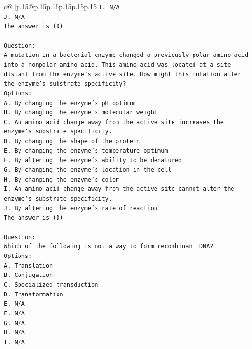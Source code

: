 \documentclass{article}
\begin{document}
{\begin{supertabular}{c@{$\;$}|p{.15\linewidth}@{}p{.15\linewidth}p{.15\linewidth}p{.15\linewidth}p{.15\linewidth}p{.15\linewidth}}
{{{\texttt{I. N/A} \\
\texttt{J. N/A} \\
\texttt{The answer is (D)} \\
\\ 
\texttt{Question:} \\
\texttt{A mutation in a bacterial enzyme changed a previously polar amino acid into a nonpolar amino acid. This amino acid was located at a site distant from the enzyme’s active site. How might this mutation alter the enzyme’s substrate specificity?} \\
\texttt{Options:} \\
\texttt{A. By changing the enzyme’s pH optimum} \\
\texttt{B. By changing the enzyme's molecular weight} \\
\texttt{C. An amino acid change away from the active site increases the enzyme's substrate specificity.} \\
\texttt{D. By changing the shape of the protein} \\
\texttt{E. By changing the enzyme's temperature optimum} \\
\texttt{F. By altering the enzyme's ability to be denatured} \\
\texttt{G. By changing the enzyme’s location in the cell} \\
\texttt{H. By changing the enzyme's color} \\
\texttt{I. An amino acid change away from the active site cannot alter the enzyme’s substrate specificity.} \\
\texttt{J. By altering the enzyme's rate of reaction} \\
\texttt{The answer is (D)} \\
\\ 
\texttt{Question:} \\
\texttt{Which of the following is not a way to form recombinant DNA?} \\
\texttt{Options:} \\
\texttt{A. Translation} \\
\texttt{B. Conjugation} \\
\texttt{C. Specialized transduction} \\
\texttt{D. Transformation} \\
\texttt{E. N/A} \\
\texttt{F. N/A} \\
\texttt{G. N/A} \\
\texttt{H. N/A} \\
\texttt{I. N/A} \\
}}}
\end{supertabular}}
\end{document}
